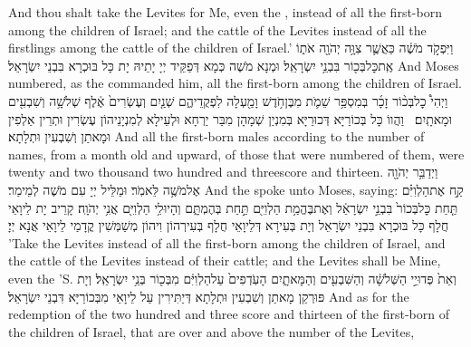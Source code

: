 {And thou shalt take the Levites for Me, even the \lord, instead of all the first-born among the children of Israel; and the cattle of the Levites instead of all the firstlings among the cattle of the children of Israel.’}{}
{וַיִּפְקֹ֣ד מֹשֶׁ֔ה כַּאֲשֶׁ֛ר צִוָּ֥ה יְהֹוָ֖ה אֹת֑וֹ אֶֽת\maqqaf כׇּל\maqqaf בְּכ֖וֹר בִּבְנֵ֥י יִשְׂרָאֵֽל׃}
{וּמְנָא מֹשֶׁה כְּמָא דְּפַקֵּיד יְיָ יָתֵיהּ יָת כָּל בּוּכְרָא בִּבְנֵי יִשְׂרָאֵל׃}
{And Moses numbered, as the \lord\space commanded him, all the first-born among the children of Israel.}{}
{וַיְהִי֩ כׇל\maqqaf בְּכ֨וֹר זָכָ֜ר בְּמִסְפַּ֥ר שֵׁמֹ֛ת מִבֶּן\maqqaf חֹ֥דֶשׁ וָמַ֖עְלָה לִפְקֻדֵיהֶ֑ם שְׁנַ֤יִם וְעֶשְׂרִים֙ אֶ֔לֶף שְׁלֹשָׁ֥ה וְשִׁבְעִ֖ים וּמָאתָֽיִם׃ \petucha }
{וַהֲווֹ כָּל בְּכוֹרַיָּא דְּכוּרַיָּא בְּמִנְיַן שְׁמָהָן מִבַּר יַרְחָא וּלְעֵילָא לְמִנְיָנֵיהוֹן עֶשְׂרִין וּתְרֵין אַלְפִין וּמָאתַן וְשִׁבְעִין וּתְלָתָא׃}
{And all the first-born males according to the number of names, from a month old and upward, of those that were numbered of them, were twenty and two thousand two hundred and threescore and thirteen.}{}
{וַיְדַבֵּ֥ר יְהֹוָ֖ה אֶל\maqqaf מֹשֶׁ֥ה לֵּאמֹֽר׃}
{וּמַלֵּיל יְיָ עִם מֹשֶׁה לְמֵימַר׃}
{And the \lord\space spoke unto Moses, saying:}{}
{קַ֣ח אֶת\maqqaf הַלְוִיִּ֗ם תַּ֤חַת כׇּל\maqqaf בְּכוֹר֙ בִּבְנֵ֣י יִשְׂרָאֵ֔ל וְאֶת\maqqaf בֶּהֱמַ֥ת הַלְוִיִּ֖ם תַּ֣חַת בְּהֶמְתָּ֑ם וְהָיוּ\maqqaf לִ֥י הַלְוִיִּ֖ם אֲנִ֥י יְהֹוָֽה׃}
{קָרֵיב יָת לֵיוָאֵי חֲלָף כָּל בּוּכְרָא בִּבְנֵי יִשְׂרָאֵל וְיָת בְּעִירָא דְּלֵיוָאֵי חֲלָף בְּעִירְהוֹן וִיהוֹן מְשַׁמְּשִׁין קֳדָמַי לֵיוָאֵי אֲנָא יְיָ׃}
{’Take the Levites instead of all the first-born among the children of Israel, and the cattle of the Levites instead of their cattle; and the Levites shall be Mine, even the \lord’S.}{}
{וְאֵת֙ פְּדוּיֵ֣י הַשְּׁלֹשָׁ֔ה וְהַשִּׁבְעִ֖ים וְהַמָּאתָ֑יִם הָעֹֽדְפִים֙ עַל\maqqaf הַלְוִיִּ֔ם מִבְּכ֖וֹר בְּנֵ֥י יִשְׂרָאֵֽל׃}
{וְיָת פּוּרְקַן מָאתַן וְשִׁבְעִין וּתְלָתָא דְּיַתִּירִין עַל לֵיוָאֵי מִבְּכוֹרַיָּא דִּבְנֵי יִשְׂרָאֵל׃}
{And as for the redemption of the two hundred and three score and thirteen of the first-born of the children of Israel, that are over and above the number of the Levites,}{}
